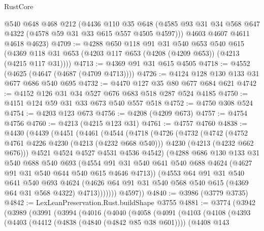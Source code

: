 \begin{lexlean}{RustCore}
\begin{coremodule}
      @540
      @648
      @468
      @212
      (@4436
        @110
        @35
        @648
        (@4585 @93 @31 @34 @568 @647 @4322 (@4578 @59 @31 @33 @615 @557 @4505 @4597)))
      @4603
      @4607
      @4611
      @4618
      @4623)
@4709 := @4288
    @650
    @118
    @91
    @31
    @540
    @653
    @540
    @615
    (@4369 @118 @31 @653 (@4203 @117 @653 (@4208 (@4209 @653)) (@4213 (@4215 @117 @31))))
@4713 := @4369 @91 @31 @615 @4505
@4718 := @4552 (@4625 (@4647 (@4687 (@4709 @4713))))
@4726 := @4124 @128 @130 @133 @31 @677 @686 @540 @695
@4732 := @4470 @127 @35 @80 @677 @684 @621
@4742 := @4152 @126 @31 @34 @527 @676 @683 @518 @287 @524 @4185
@4750 := @4151 @124 @59 @31 @33 @673 @540 @557 @518
@4752 := @4750 @308 @524
@4754 := @4203 @123 @673
@4756 := @4208 (@4209 @673)
@4757 := @4754 @4756
@4760 := @4213 (@4215 @123 @31)
@4761 := @4757 @4760
@4838 := @4430
    (@4439
      (@4451
        (@4461
          (@4544
            (@4718
              (@4726
                (@4732
                  (@4742
                    (@4752 @4761 @4226 @4230 (@4213 (@4232 @668 @540)))
                    @4230
                    (@4213 (@4232 @662 @676)))
                  @4521
                  @4524
                  @4527
                  @4531
                  @4536
                  @4542)
                (@4288
                  @686
                  @130
                  @133
                  @31
                  @540
                  @688
                  @540
                  @693
                  (@4554
                    @91
                    @31
                    @540
                    @641
                    @540
                    @688
                    @4624
                    (@4627 @91 @31 @540 @644 @540 @615 @4646 @4713))
                  (@4553
                    @64
                    @91
                    @31
                    @540
                    @641
                    @540
                    @693
                    @4624
                    (@4626 @64 @91 @31 @540 @568 @540 @615 (@4369 @64 @31 @568 @4322) @4713)))))))
        @4597))
@4840 := @3986 (@3779 @3735)
@4842 := LexLeanPreservation.Rust.buildShape @3755
@4881 := @3774
    (@3942
      (@3989
        (@3991
          (@3994
            (@4016
              (@4040
                (@4058
                  (@4091
                    (@4103
                      (@4108
                        (@4393
                          (@4403
                            (@4412 (@4838 (@4840 (@4842 @85 @38 @601))))
                            (@4408
                              @143

\end{coremodule}
\end{lexlean}
